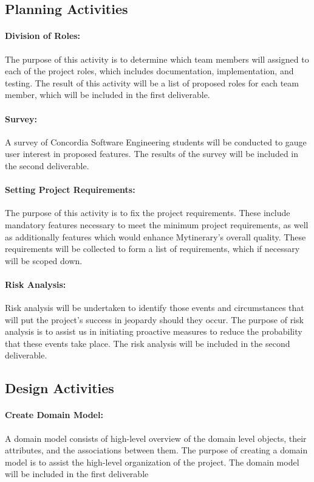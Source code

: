 \documentclass[12pt]{article}
\begin{document}
\subsection*{Planning Activities}
\paragraph*{Division of Roles:}The purpose of this activity is to determine which team members will assigned to each of the project roles, which includes documentation, implementation, and testing. The result of this activity will be a list of proposed roles for each team member, which will be included in the first deliverable.

\paragraph*{Survey:}A survey of Concordia Software Engineering students will be conducted to gauge user interest in proposed features. The results of the survey will be included in the second deliverable.

\paragraph*{Setting Project Requirements:}The purpose of this activity is to fix the project requirements. These include mandatory features necessary to meet the minimum project requirements, as well as additionally features which would enhance Mytinerary's overall quality. These requirements will be collected to form a list of requirements, which if necessary will be scoped down.

\paragraph*{Risk Analysis:}Risk analysis will be undertaken to identify those events and circumstances that will put the project's success in jeopardy should they occur. The purpose of risk analysis is to assist us in initiating proactive measures to reduce the probability that these events take place. The risk analysis will be included in the second deliverable.

\subsection*{Design Activities}

\paragraph*{Create Domain Model:}A domain model consists of high-level overview of the domain level objects, their attributes, and the associations between them. The purpose of creating a domain model is to assist the high-level organization of the project. The domain model will be included in the first deliverable
\end{document}
